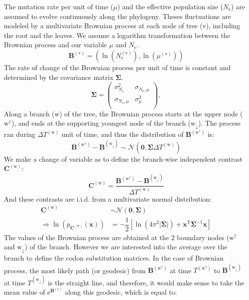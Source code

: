 \documentclass{article}
\newcommand{\branch}{\text{w}}
\newcommand{\up}{\branch^{\uparrow}}
\newcommand{\down}{\branch_{\downarrow}}
\newcommand{\node}{\text{v}}
\newcommand{\e}{\mathrm{e}}
\newcommand{\Ne}{N_\e}
\newcommand{\covariance}{\bm{\Sigma}}
\newcommand{\brownian}{\bm{B}}
\newcommand{\contrast}{\bm{C}}
\begin{document}
The mutation rate per unit of time ($\mu$) and the effective population size ($\Ne$) are assumed to evolve continuously along the phylogeny. Theses fluctuations are modeled by a multivariate Brownian process at each node of tree ($\node$), including the root and the leaves. We assume a logarithm transformation between the Brownian process and our variable $\mu$ and $\Ne$.
\begin{equation}
\brownian^{(\node)}=\left(\ln\left(\Ne^{(\node)}\right), \ln\left(\mu^{(\node)}\right)\right)
\end{equation}
The rate of change of the Brownian process per unit of time is constant and determined by the covariance matrix $\covariance$.
\begin{equation}
\covariance = \begin{pmatrix}
\sigma_{\Ne}^2 & \sigma_{\Ne, \mu}  \\ 
\sigma_{\Ne, \mu} & \sigma_{\mu}^2 \\ 
\end{pmatrix},
\end{equation}
Along a branch ($\branch$) of the tree, the Brownian process starts at the upper node ($\up$), and ends at the supporting youngest node of the branch ($\down$). The process ran during $\Delta T^{(\branch)}$ unit of time, and thus the distribution of $\brownian^{(\up)}$ is:
\begin{equation}
\brownian^{(\up)} - \brownian^{(\down)}  \sim \mathcal{N}\left(\bm{0}, \covariance \Delta T^{(\branch)} \right)
\end{equation}
We make a change of variable as to define the branch-wise independent contrast $\contrast^{(\branch)}$:
\begin{equation}
\label{eq:independent_contrast}
\contrast^{(\branch)} = \dfrac{\brownian^{(\up)} - \brownian^{(\down)}}{\Delta T^{(\branch)}} 
\end{equation}
And these contrasts are i.i.d. from a multivariate normal distribution:
\begin{align}
\contrast^{(\branch)} & \sim \mathcal{N}\left(\bm{0}, \covariance \right) \\
\Rightarrow \ln \left(p_{\contrast^{(\branch)}}\left(\bm{x}\right)\right) & = - \dfrac{1}{2}\left[\ln \left( 4\pi^2 \left| \covariance \right| \right) + \bm{x}^{\mathrm{T}} \covariance^{-1} \bm{x} \right]
\end{align}
The values of the Brownian process are obtained at the $2$ boundary nodes ($\up$ and $\down$) of the branch. However we are interested into the average over the branch to define the codon substitution matrices. In the case of Brownian process, the most likely path (or geodesic) from $\brownian^{(\up)}$ at time $T^{(\up)}$ to $\brownian^{(\down)}$ at time $T^{(\down)}$ is the straight line, and therefore, it would make sense to take the mean value of $\e^{\brownian^{(\node)}}$ along this geodesic, which is equal to:
\end{document}
